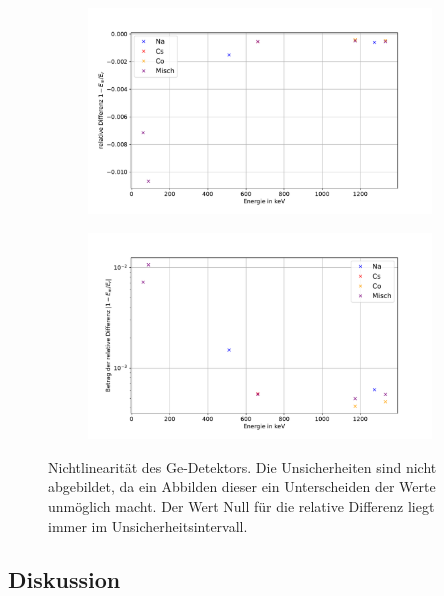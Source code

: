 \documentclass[
	a4paper,
	12pt,
	pagesize,
	ngerman
]{scrartcl}
\begin{document}
\begin{figure}[H]
		\centering
		\begin{subfigure}[t]{0.8\textwidth}
			\centering
			\includegraphics[width= \linewidth]{img/diff_ge.pdf}
		\end{subfigure}
		\begin{subfigure}[t]{0.8\textwidth}
			\centering
			\includegraphics[width= \linewidth]{img/diff_ge_log.pdf}
		\end{subfigure}
		\caption{Nichtlinearität des Ge-Detektors.
		Die Unsicherheiten sind nicht abgebildet, da ein Abbilden dieser ein Unterscheiden der Werte unmöglich macht.
		Der Wert Null für die relative Differenz liegt immer im Unsicherheitsintervall.
		}
		\label{fg_diff_ge}
	\end{figure}


	\subsection{Diskussion}
\end{document}
